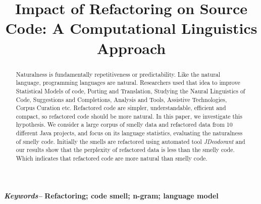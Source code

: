 \documentclass[conference]{IEEEtran}
\providecommand{\keywords}[1]{\textbf{\textit{Keywords--}} #1}
\begin{document}
%
\title{Impact of Refactoring on Source Code: A Computational Linguistics Approach}


\author{
	}

\maketitle

\begin{abstract}
Naturalness is fundamentally repetitiveness or predictability.  Like the natural language, programming languages are natural. Researchers used that idea to improve 
Statistical Models of code, Porting and Translation, Studying the Naural Linguistics of Code, Suggestions and Completions, Analysis and Tools, Assistive Technologies, Corpus Curation etc. Refactored code are simpler, understandable, efficient and compact, so refactored code should be more natural. In this paper, we investigate this hypothesis. We consider a large corpus of smelly data and refactored data from 10 different Java projects, and focus on its language statistics, evaluating the naturalness of smelly code. Initially the smells are refactored using automated tool \textit{JDeodorant} and our results show that the perplexity of refactored data is less than the smelly code. Which indicates that refactored code are more natural than smelly code.
\end{abstract}

\keywords{\textbf{Refactoring; code smell; n-gram; language model}}


%
\IEEEpeerreviewmaketitle
\end{document}
